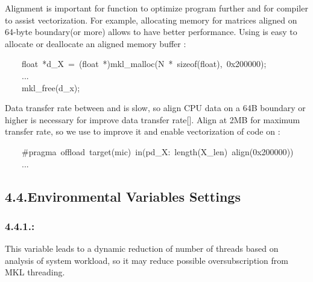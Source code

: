 \documentclass{article}
\begin{document}
\noindent{}Alignment is important for  function to optimize program further and for compiler to assist vectorization. For example, allocating memory for matrices aligned on 64-byte boundary(or more) allows  to have better performance. Using  is easy to allocate or deallocate an aligned  memory buffer :%
\begin{mdpre}%
\noindent~~~~{float}~*d\_X~=~({float}~*)mkl\_malloc({N}~*~sizeof({float}),~{0x200000});\\
~~~~...\\
~~~~mkl\_free(d\_x);%
\end{mdpre}\noindent{}Data transfer rate between  and  is slow, so align CPU data on a 64B boundary or higher is necessary for improve data transfer rate[]. Align at 2MB for maximum transfer rate, so we use  to improve it and enable vectorization of code on :
\begin{mdpre}%
\noindent~~~~\#pragma~offload~target(mic)~in(pd\_X:~length({X\_len})~align({0x200000}))\\
~~~~...%
\end{mdpre}
\subsection{4.4.\hspace*{0.5em}Environmental Variables Settings}\label{sec-environmental-variables-settings}%

\subsubsection{4.4.1.\hspace*{0.5em}:}\label{sec-mkl_dynamictrue-}%

\noindent{}This variable leads to a dynamic reduction of number of  threads based on analysis of system workload, so it may reduce possible oversubscription from MKL threading.%
\end{document}

